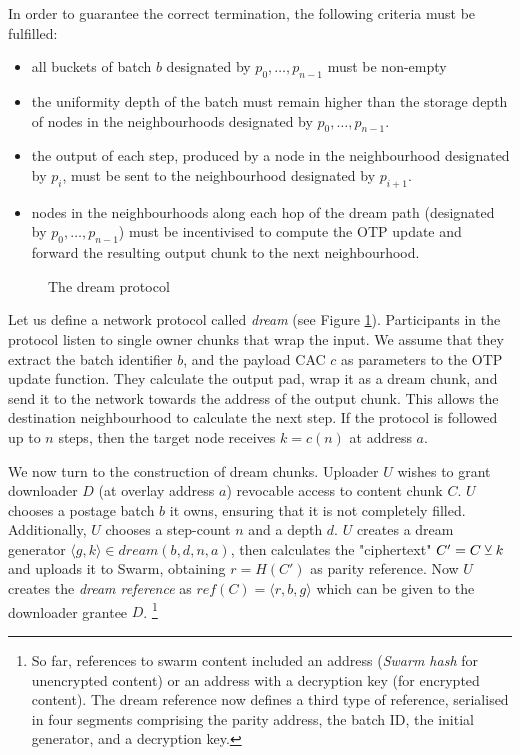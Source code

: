 In order to guarantee the correct termination, the following criteria must be fulfilled:
\begin{itemize}
\item all  buckets of batch $b$ designated by $p_0,\ldots, p_{n-1}$ must be non-empty
\item the uniformity depth of the batch must remain higher than the storage depth of nodes in the neighbourhoods designated by $p_0, \ldots , p_{n-1}$.
\item the output of each step, produced by a node in the neighbourhood designated by $p_i$, must be sent to the 
neighbourhood designated by $p_{i+1}$. 
\item  nodes in the neighbourhoods along each hop of the dream path (designated by $p_0,\ldots, p_{n-1}$) must be 
incentivised to compute the OTP update and forward the resulting output chunk to the next neighbourhood. 
\end{itemize}


\begin{figure}[htbp]
  \centering
  \caption{The dream protocol}
\label{fig:protocol}
\end{figure}


Let us  define a network protocol called \emph{dream} (see Figure \ref{fig:protocol}). Participants in the protocol listen to single owner chunks that wrap the input.
We assume that they extract the batch identifier $b$, and the payload CAC $c$ as parameters to the OTP update function. They calculate the output pad, wrap it as a dream chunk, and send it to the network towards the address of the output chunk. This allows the destination neighbourhood 
to calculate the next step. If the protocol is followed up to $n$ steps, then the target node receives $k=c(n)$ at address $a$. 


We now turn to the construction of dream chunks. 
Uploader $U$ wishes to grant downloader $D$ (at overlay address $a$) revocable  access to content chunk $C$.
$U$  chooses a postage batch $b$ it owns, ensuring that it is not completely filled. Additionally, $U$ chooses a step-count $n$ and a depth $d$.  
$U$ creates a dream generator $\langle g, k\rangle\in\mathit{dream}(b,d,n,a)$, then
calculates the "ciphertext" $C'=C \veebar k$ and uploads it to Swarm, obtaining $r=\mathit{H}(C')$ as parity reference. Now $U$ creates the \emph{dream reference} as $\mathit{ref}(C)=\langle r,b,g\rangle $ which can be given to the downloader grantee $D$.%
%
\footnote{So far, references to swarm content included an address (\emph{Swarm hash} for unencrypted content) or an address with a decryption key (for encrypted content). The dream reference now defines a third type of reference, serialised in four segments comprising the parity address, the batch ID, the initial generator, and a decryption key.}

